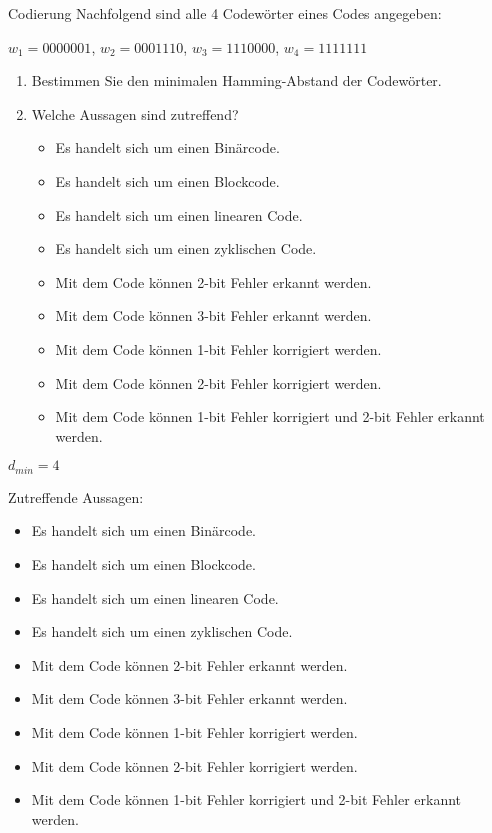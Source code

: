 \documentclass{exercisesheet}
\begin{document}
\begin{exercise*}{Codierung}
  Nachfolgend sind alle 4 Codewörter eines Codes angegeben:
  \begin{center} $w_1 = 0000001$, $w_2 = 0001110$, $w_3 = 1110000$, $w_4 = 1111111$ \end{center}
  \begin{enumerate}
    \item Bestimmen Sie den minimalen Hamming-Abstand der Codewörter.
    \item Welche Aussagen sind zutreffend?
          \begin{itemize}
            \item Es handelt sich um einen Binärcode.
            \item Es handelt sich um einen Blockcode.
            \item Es handelt sich um einen linearen Code.
            \item Es handelt sich um einen zyklischen Code.
            \item Mit dem Code können 2-bit Fehler erkannt werden.
            \item Mit dem Code können 3-bit Fehler erkannt werden.
            \item Mit dem Code können 1-bit Fehler korrigiert werden.
            \item Mit dem Code können 2-bit Fehler korrigiert werden.
            \item Mit dem Code können 1-bit Fehler korrigiert und 2-bit Fehler erkannt werden.
          \end{itemize}
  \end{enumerate}
\end{exercise*}

\begin{solution}
  \item $d_{min} = 4$
  \item Zutreffende Aussagen:
  \begin{itemize}
    \item Es handelt sich um einen Binärcode. \checkmark
    \item Es handelt sich um einen Blockcode. \checkmark
    \item Es handelt sich um einen linearen Code. \checkmark
    \item Es handelt sich um einen zyklischen Code. \checkmark
    \item Mit dem Code können 2-bit Fehler erkannt werden. \checkmark
    \item Mit dem Code können 3-bit Fehler erkannt werden. \checkmark
    \item Mit dem Code können 1-bit Fehler korrigiert werden. \checkmark
    \item Mit dem Code können 2-bit Fehler korrigiert werden. \xmark
    \item Mit dem Code können 1-bit Fehler korrigiert und 2-bit Fehler erkannt werden. \checkmark
  \end{itemize}
\end{solution}
\end{document}
